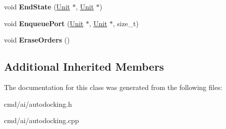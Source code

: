 \begin{DoxyCompactItemize}
\item 
void {\bfseries End\+State} (\hyperlink{classUnit}{Unit} $\ast$, \hyperlink{classUnit}{Unit} $\ast$)\hypertarget{classOrders_1_1AutoDocking_a219027e143912c21700a4c814f194c2f}{}\label{classOrders_1_1AutoDocking_a219027e143912c21700a4c814f194c2f}

\item 
void {\bfseries Enqueue\+Port} (\hyperlink{classUnit}{Unit} $\ast$, \hyperlink{classUnit}{Unit} $\ast$, size\+\_\+t)\hypertarget{classOrders_1_1AutoDocking_a28cb733856d4d700870f152aeef88a4f}{}\label{classOrders_1_1AutoDocking_a28cb733856d4d700870f152aeef88a4f}

\item 
void {\bfseries Erase\+Orders} ()\hypertarget{classOrders_1_1AutoDocking_a2d145f9baba3322593d101a1281b6b05}{}\label{classOrders_1_1AutoDocking_a2d145f9baba3322593d101a1281b6b05}

\end{DoxyCompactItemize}
\subsection*{Additional Inherited Members}


The documentation for this class was generated from the following files\+:\begin{DoxyCompactItemize}
\item 
cmd/ai/autodocking.\+h\item 
cmd/ai/autodocking.\+cpp\end{DoxyCompactItemize}
